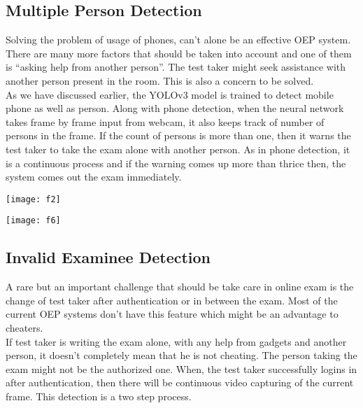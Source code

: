 \documentclass[12pt]{report}
\begin{document}
\subsection{Multiple Person Detection}

Solving the problem of usage of phones, can’t alone be an effective OEP system. There are many more factors that should be taken into account and one of them is “asking help from another person”. The test taker might seek assistance with another person present in the room. This is also a concern to be solved. \\

	As we have discussed earlier, the YOLOv3 model is trained to detect mobile phone as well as person. Along with phone detection, when the neural network takes frame by frame input from webcam, it also keeps track of number of persons in the frame. If the count of persons is more than one, then it warns the test taker to take the exam alone with another person. As in phone detection, it is a continuous process and if the warning comes up more than thrice then, the system comes out the exam immediately. 

\begin{center}
\begin{minipage}{0.49\linewidth}
\texttt{[image: f2]}
\end{minipage}%
\hfill
\begin{minipage}{0.49\linewidth}
\texttt{[image: f6]}
\end{minipage}
\end{center}

\subsection{Invalid Examinee Detection}
A rare but an important challenge that should be take care in online exam is the change of test taker after authentication or in between the exam. Most of the current OEP systems don’t have this feature which might be an advantage to cheaters. \\

		If test taker is writing the exam alone, with any help from gadgets and another person, it doesn’t completely mean that he is not cheating. The person taking the exam might not be the authorized one. When, the test taker successfully logins in after authentication, then there will be continuous video capturing of the current frame. This detection is a two step process. 
\end{document}
